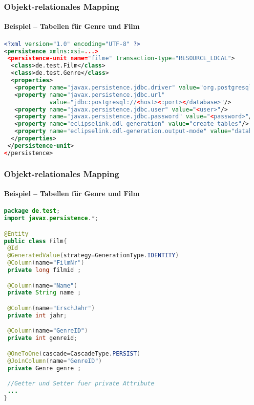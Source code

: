 \begin{frame}[fragile]\frametitle{Objekt-relationales Mapping}
    \framesubtitle{Beispiel -- Tabellen f\"ur Genre und Film}
\lstset{language=xml}
\begin{lstlisting}[xleftmargin=3ex, language=xml]
<?xml version="1.0" encoding="UTF-8" ?>
<persistence xmlns:xsi=...> 
 <persistence-unit name="filme" transaction-type="RESOURCE_LOCAL">   
  <class>de.test.Film</class>   
  <class>de.test.Genre</class>   
  <properties>     
   <property name="javax.persistence.jdbc.driver" value="org.postgresql.Driver"/>     
   <property name="javax.persistence.jdbc.url" 
             value="jdbc:postgresql://<host><:port></database>"/>
   <property name="javax.persistence.jdbc.user" value="<user>"/>
   <property name="javax.persistence.jdbc.password" value="<password>"/>
   <property name="eclipselink.ddl-generation" value="create-tables"/>
   <property name="eclipselink.ddl-generation.output-mode" value="database"/>
  </properties>
 </persistence-unit>
</persistence> 
	\end{lstlisting}
\end{frame}

\begin{frame}[fragile]\frametitle{Objekt-relationales Mapping}
    \framesubtitle{Beispiel -- Tabellen f\"ur Genre und Film}
\lstset{language=Java}
\begin{lstlisting}[xleftmargin=3ex, basicstyle=\ttfamily\tiny, language=Java]
package de.test;
import javax.persistence.*;

@Entity
public class Film{
 @Id
 @GeneratedValue(strategy=GenerationType.IDENTITY)
 @Column(name="FilmNr")
 private long filmid ; 

 @Column(name="Name")
 private String name ; 

 @Column(name="ErschJahr")
 private int jahr;

 @Column(name="GenreID")
 private int genreid;

 @OneToOne(cascade=CascadeType.PERSIST)
 @JoinColumn(name="GenreID")
 private Genre genre ; 

 //Getter und Setter fuer private Attribute
 ...
}
\end{lstlisting}
\end{frame}


